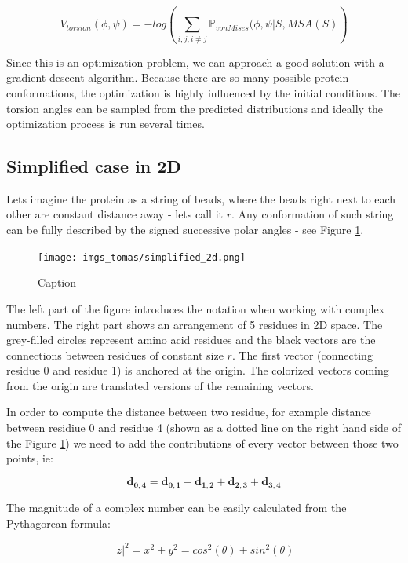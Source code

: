 \begin{equation}
    V_{torsion}(\phi, \psi) = -log\left(\sum_{i, j, i \neq j} \mathds{P}_{von Mises} (\phi, \psi | S, MSA(S)\right)
\end{equation}
        
Since this is an optimization problem, we can approach a good solution with a gradient descent algorithm. 
Because there are so many possible protein conformations, the optimization is highly influenced by the initial conditions. 
The torsion angles can be sampled from the predicted distributions and ideally the optimization process is run several times.  
        
\subsection{Simplified case in 2D}
Lets imagine the protein as a string of beads, where the beads right next to each other are constant distance away - lets call it $r$. 
Any conformation of such string can be fully described by the signed successive polar angles - see Figure \ref{fig:struct_real2d}.
        
\begin{figure}[ht]
    \centering
    \texttt{[image: imgs\_tomas/simplified\_2d.png]}
    \caption{Caption}
    \label{fig:struct_real2d}
\end{figure}
        
The left part of the figure introduces the notation when working with complex numbers. 
The right part shows an arrangement of 5 residues in 2D space. 
The grey-filled circles represent amino acid residues and the black vectors are the connections between residues of constant size $r$. 
The first vector (connecting residue 0 and residue 1) is anchored at the origin. 
The colorized vectors coming from the origin are translated versions of the remaining vectors. 
        
In order to compute the distance between two residue, for example distance between residiue 0 and residue 4 (shown as a dotted line on the right hand side of the Figure \ref{fig:struct_real2d}) we need to add the contributions of every vector between those two points, ie:
        
$$\bm{d_{0,4}} = \bm{d_{0,1}} + \bm{d_{1,2}} + \bm{d_{2,3}} + \bm{d_{3,4}}$$
        
The magnitude of a complex number can be easily calculated from the Pythagorean formula:
        
\begin{equation}
    |z|^2 = x^2 + y^2 = cos^2(\theta) + sin^2(\theta)
    \label{eq:complex_magnitude}
\end{equation}
        
